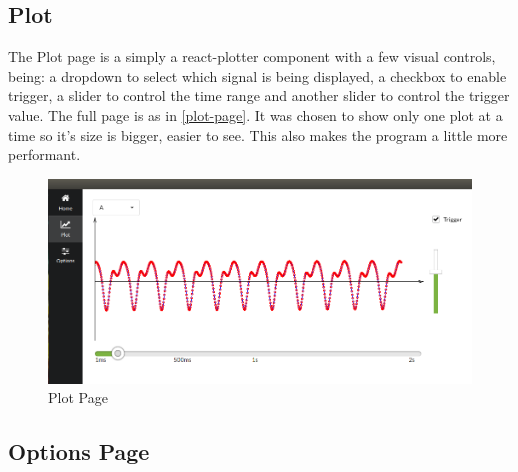 \subsection{Plot}
The Plot page is a simply a react-plotter \cite{react-plotter} component with a few
visual controls, being: a dropdown to select which signal is being displayed,
a checkbox to enable trigger, a slider to control the time
range and another slider to control the trigger value. The full page is as in \autoref{plot-page}.
It was chosen to show only one plot at a time so it's size is bigger, easier to see.
This also makes the program a little more performant.
\begin{figure}[htb]
	\caption{Plot Page}
  \label{plot-page}
	\begin{center}
    \includegraphics[width=0.7\paperwidth]{images/snapshots/plot-trigger-A.png}
	\end{center}
\end{figure}

\subsection{Options Page}
